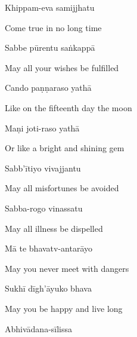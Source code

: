Khippam-eva samijjhatu

\begin{english}
  Come true in no long time
\end{english}

Sabbe pūrentu saṅkappā

\begin{english}
  May all your wishes be fulfilled
\end{english}

Cando paṇṇaraso yathā

\begin{english}
  Like on the fifteenth day the moon
\end{english}

Maṇi joti-raso yathā\hyperlink{endnote116-appendix}{\hypertarget{endnote116-body}{}}

\begin{english}
  Or like a bright and shining gem\\
\end{english}

Sabb'ītiyo vivajjantu\hyperlink{endnote117-appendix}{\hypertarget{endnote117-body}{}}

\begin{english}
  May all misfortunes be avoided
\end{english}

Sabba-rogo vinassatu

\begin{english}
  May all illness be dispelled
\end{english}

Mā te bhavatv-antarāyo

\begin{english}
  May you never meet with dangers
\end{english}

Sukhī dīgh'āyuko bhava

\begin{english}
  May you be happy and live long
\end{english}

Abhivādana-sīlissa

